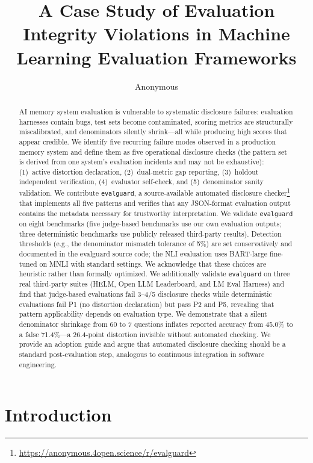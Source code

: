 \documentclass[11pt]{article}
\title{A Case Study of Evaluation Integrity Violations in Machine Learning Evaluation Frameworks}
\author{Anonymous}
\begin{document}
\maketitle

\begin{abstract}
AI memory system evaluation is vulnerable to systematic disclosure failures: evaluation harnesses contain bugs, test sets become contaminated, scoring metrics are structurally miscalibrated, and denominators silently shrink---all while producing high scores that appear credible. We identify five recurring failure modes observed in a production memory system and define them as five operational disclosure checks (the pattern set is derived from one system's evaluation incidents and may not be exhaustive): (1)~active distortion declaration, (2)~dual-metric gap reporting, (3)~holdout independent verification, (4)~evaluator self-check, and (5)~denominator sanity validation. We contribute \texttt{evalguard}, a source-available automated disclosure checker\footnote{\url{https://anonymous.4open.science/r/evalguard}} that implements all five patterns and verifies that any JSON-format evaluation output contains the metadata necessary for trustworthy interpretation. We validate \texttt{evalguard} on eight benchmarks (five judge-based benchmarks use our own evaluation outputs; three deterministic benchmarks use publicly released third-party results). Detection thresholds (e.g., the denominator mismatch tolerance of 5\%) are set conservatively and documented in the evalguard source code; the NLI evaluation uses BART-large fine-tuned on MNLI with standard settings. We acknowledge that these choices are heuristic rather than formally optimized. We additionally validate \texttt{evalguard} on three real third-party suites (HELM, Open LLM Leaderboard, and LM Eval Harness) and find that judge-based evaluations fail 3--4/5 disclosure checks while deterministic evaluations fail P1 (no distortion declaration) but pass P2 and P5, revealing that pattern applicability depends on evaluation type. We demonstrate that a silent denominator shrinkage from 60 to 7 questions inflates reported accuracy from 45.0\% to a false 71.4\%---a 26.4-point distortion invisible without automated checking. We provide an adoption guide and argue that automated disclosure checking should be a standard post-evaluation step, analogous to continuous integration in software engineering.
\end{abstract}

\section{Introduction}
\end{document}
